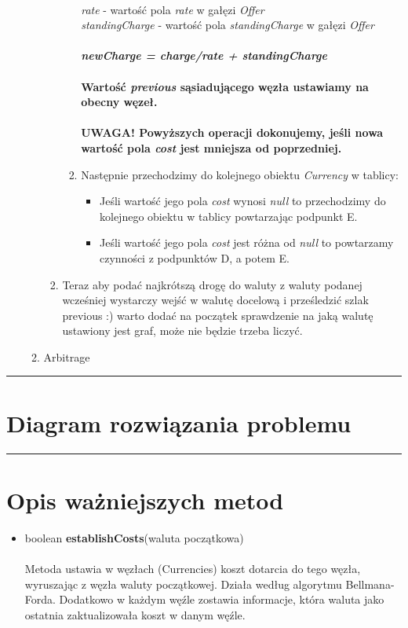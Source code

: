 \documentclass[a4paper,11pt]{article}
\newcommand{\linia}{\rule{\linewidth}{0.4mm}}
\begin{document}
\begin{enumerate}
\begin{enumerate}
\begin{enumerate}
\begin{enumerate}
\\ \textit{rate} - wartość pola \textit{rate} w gałęzi \textit{Offer}
\\ \textit{standingCharge} - wartość pola \textit{standingCharge} w gałęzi \textit{Offer}
\\
\\ \textbf{\emph{newCharge = charge/rate + standingCharge }}
\\
\\\textbf{Wartość \textit{previous} sąsiadującego węzła ustawiamy na obecny węzeł.}
\\
\textbf{\\ UWAGA! Powyższych operacji dokonujemy, jeśli nowa wartość pola \textit{cost} jest mniejsza od poprzedniej.}
\\
\item  Następnie przechodzimy do kolejnego obiektu \textit{Currency} w tablicy:
\begin{itemize}
\item Jeśli wartość jego pola \textit{cost} wynosi \textit{null} to przechodzimy do kolejnego obiektu w tablicy powtarzając podpunkt E.
\item Jeśli wartość jego pola \textit{cost} jest różna od \textit{null} to powtarzamy czynności z podpunktów D, a potem E.
\end{itemize}
\end{enumerate}
\item Teraz aby podać najkrótszą drogę do waluty z waluty podanej wcześniej wystarczy wejść w walutę docelową i prześledzić szlak previous :) warto dodać na początek sprawdzenie na jaką walutę ustawiony jest graf, może nie będzie trzeba liczyć.
\end{enumerate} 
\item Arbitrage
\end{enumerate}
\end{enumerate}

\noindent\linia
\section{Diagram rozwiązania problemu}


\noindent\linia
\section{Opis ważniejszych metod}
\begin{itemize}
\item boolean \textbf{establishCosts}(waluta początkowa)
\\\\
Metoda ustawia w węzłach (Currencies) koszt dotarcia do tego węzła, wyruszając z węzła waluty początkowej. Działa według algorytmu Bellmana-Forda.
Dodatkowo w każdym węźle zostawia informacje, która waluta jako ostatnia zaktualizowała koszt w danym węźle.
\end{itemize}
\end{document}

